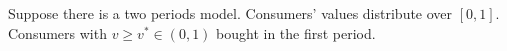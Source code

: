 \documentclass[11pt]{elegantbook}
\begin{document}
Suppose there is a two periods model. Consumers' values distribute over $[0,1]$. Consumers with $v\geq v^*\in (0,1)$ bought in the first period.












































































\end{document}
